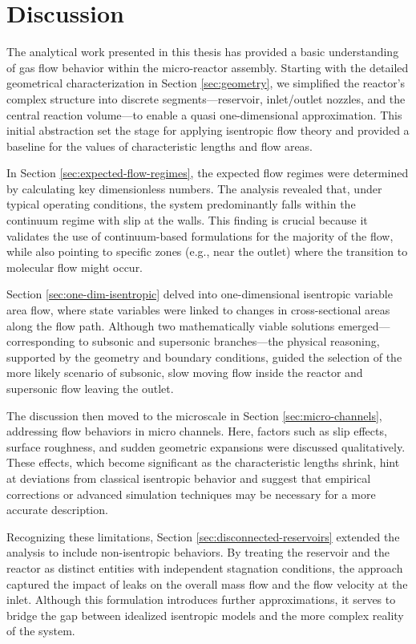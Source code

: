 \section*{Discussion}
The analytical work presented in this thesis has provided a basic understanding of gas flow behavior within the micro-reactor assembly.
Starting with the detailed geometrical characterization in Section \ref{sec:geometry}, we simplified the reactor’s complex structure into discrete segments—reservoir, inlet/outlet nozzles, and the central reaction volume—to enable a quasi one-dimensional approximation.
This initial abstraction set the stage for applying isentropic flow theory and provided a baseline for the values of characteristic lengths and flow areas.

In Section \ref{sec:expected-flow-regimes}, the expected flow regimes were determined by calculating key dimensionless numbers.
The analysis revealed that, under typical operating conditions, the system predominantly falls within the continuum regime with slip at the walls.
This finding is crucial because it validates the use of continuum-based formulations for the majority of the flow, while also pointing to specific zones (e.g., near the outlet) where the transition to molecular flow might occur.

Section \ref{sec:one-dim-isentropic} delved into one-dimensional isentropic variable area flow, where state variables were linked to changes in cross-sectional areas along the flow path.
Although two mathematically viable solutions emerged—corresponding to subsonic and supersonic branches—the physical reasoning, supported by the geometry and boundary conditions, guided the selection of the more likely scenario of subsonic, slow moving flow inside the reactor and supersonic flow leaving the outlet.

The discussion then moved to the microscale in Section \ref{sec:micro-channels}, addressing flow behaviors in micro channels.
Here, factors such as slip effects, surface roughness, and sudden geometric expansions were discussed qualitatively.
These effects, which become significant as the characteristic lengths shrink, hint at deviations from classical isentropic behavior and suggest that empirical corrections or advanced simulation techniques may be necessary for a more accurate description.

Recognizing these limitations, Section \ref{sec:disconnected-reservoirs} extended the analysis to include non-isentropic behaviors.
By treating the reservoir and the reactor as distinct entities with independent stagnation conditions, the approach captured the impact of leaks on the overall mass flow and the flow velocity at the inlet.
Although this formulation introduces further approximations, it serves to bridge the gap between idealized isentropic models and the more complex reality of the system.

